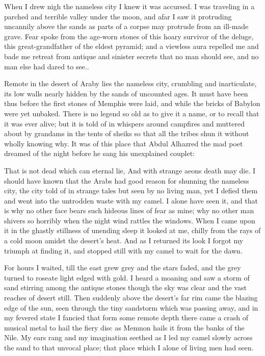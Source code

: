 ﻿\documentclass{article}
\begin{document}
When I drew nigh the nameless city I knew it was accursed. I was traveling in a
parched and terrible valley under the moon, and afar I saw it protruding
uncannily above the sands as parts of a corpse may protrude from an ill-made
grave. Fear spoke from the age-worn stones of this hoary survivor of the
deluge, this great-grandfather of the eldest pyramid; and a viewless aura
repelled me and bade me retreat from antique and sinister secrets that no man
should see, and no man else had dared to see..

Remote in the desert of Araby lies the nameless city, crumbling and
inarticulate, its low walls nearly hidden by the sands of uncounted ages. It
must have been thus before the first stones of Memphis were laid, and while the
bricks of Babylon were yet unbaked. There is no legend so old as to give it a
name, or to recall that it was ever alive; but it is told of in whispers around
campfires and muttered about by grandams in the tents of sheiks so that all the
tribes shun it without wholly knowing why. It was of this place that Abdul
Alhazred the mad poet dreamed of the night before he sang his unexplained
couplet:

That is not dead which can eternal lie, And with strange aeons death may die.
I should have known that the Arabs had good reason for shunning the nameless
city, the city told of in strange tales but seen by no living man, yet I defied
them and went into the untrodden waste with my camel. I alone have seen it, and
that is why no other face bears such hideous lines of fear as mine; why no
other man shivers so horribly when the night wind rattles the windows. When I
came upon it in the ghastly stillness of unending sleep it looked at me, chilly
from the rays of a cold moon amidst the desert's heat. And as I returned its
look I forgot my triumph at finding it, and stopped still with my camel to wait
for the dawn.

For hours I waited, till the east grew grey and the stars faded, and the grey
turned to roseate light edged with gold. I heard a moaning and saw a storm of
sand stirring among the antique stones though the sky was clear and the vast
reaches of desert still. Then suddenly above the desert's far rim came the
blazing edge of the sun, seen through the tiny sandstorm which was passing
away, and in my fevered state I fancied that form some remote depth there came
a crash of musical metal to hail the fiery disc as Memnon hails it from the
banks of the Nile. My ears rang and my imagination seethed as I led my camel
slowly across the sand to that unvocal place; that place which I alone of
living men had seen.
\end{document}
